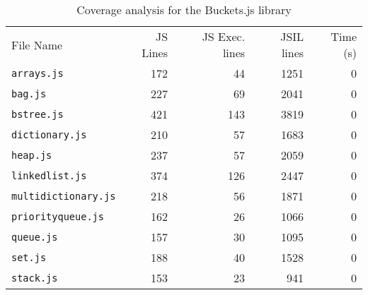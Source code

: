 \begin{table}[h]
{
\small
\begin{tabular}{lrrrr}
\toprule
File Name & JS Lines & JS Exec. lines & JSIL lines & Time (s)\\
\cmidrule{1-5}
\texttt{arrays.js} & 172 & 44 & 1251 & 0 \\
\texttt{bag.js} & 227 & 69 & 2041 & 0\\
\texttt{bstree.js} & 421 & 143 & 3819 & 0\\
\texttt{dictionary.js} & 210 & 57 & 1683 & 0\\
\texttt{heap.js} & 237 & 57 & 2059 & 0\\
\texttt{linkedlist.js} & 374 & 126 & 2447 & 0\\
\texttt{multidictionary.js} & 218 & 56 & 1871 & 0\\
\texttt{priorityqueue.js} & 162 & 26 & 1066 & 0\\
\texttt{queue.js} & 157 & 30 & 1095 & 0\\
\texttt{set.js} & 188 & 40 & 1528 & 0\\
\texttt{stack.js} & 153 & 23 & 941 & 0\\
\bottomrule
\end{tabular}
}
\caption{Coverage analysis for the Buckets.js library}
\end{table}
